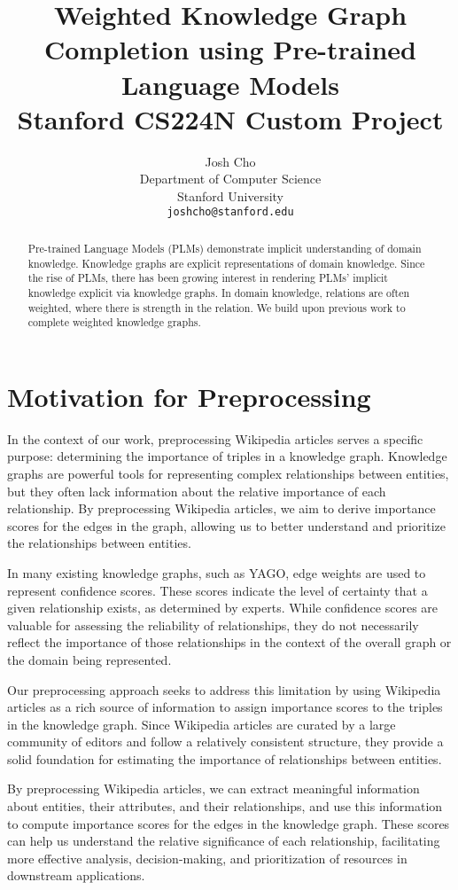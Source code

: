 \documentclass{article}
\title{
  Weighted Knowledge Graph Completion using Pre-trained Language Models \\
  \vspace{1em}
  \small{\normalfont Stanford CS224N Custom Project}  %
}
\author{
  Josh Cho \\
  Department of Computer Science \\
  Stanford University \\
  \texttt{joshcho@stanford.edu} \\
}
\begin{document}
\maketitle

\begin{abstract}
  Pre-trained Language Models (PLMs) demonstrate implicit understanding of domain knowledge. Knowledge graphs are explicit representations of domain knowledge. Since the rise of PLMs, there has been growing interest in rendering PLMs' implicit knowledge explicit via knowledge graphs. In domain knowledge, relations are often weighted, where there is strength in the relation. We build upon previous work to complete weighted knowledge graphs.
\end{abstract}

\section{Motivation for Preprocessing}

In the context of our work, preprocessing Wikipedia articles serves a specific purpose: determining the importance of triples in a knowledge graph. Knowledge graphs are powerful tools for representing complex relationships between entities, but they often lack information about the relative importance of each relationship. By preprocessing Wikipedia articles, we aim to derive importance scores for the edges in the graph, allowing us to better understand and prioritize the relationships between entities.

In many existing knowledge graphs, such as YAGO, edge weights are used to represent confidence scores. These scores indicate the level of certainty that a given relationship exists, as determined by experts. While confidence scores are valuable for assessing the reliability of relationships, they do not necessarily reflect the importance of those relationships in the context of the overall graph or the domain being represented.

Our preprocessing approach seeks to address this limitation by using Wikipedia articles as a rich source of information to assign importance scores to the triples in the knowledge graph. Since Wikipedia articles are curated by a large community of editors and follow a relatively consistent structure, they provide a solid foundation for estimating the importance of relationships between entities.

By preprocessing Wikipedia articles, we can extract meaningful information about entities, their attributes, and their relationships, and use this information to compute importance scores for the edges in the knowledge graph. These scores can help us understand the relative significance of each relationship, facilitating more effective analysis, decision-making, and prioritization of resources in downstream applications.
\end{document}

